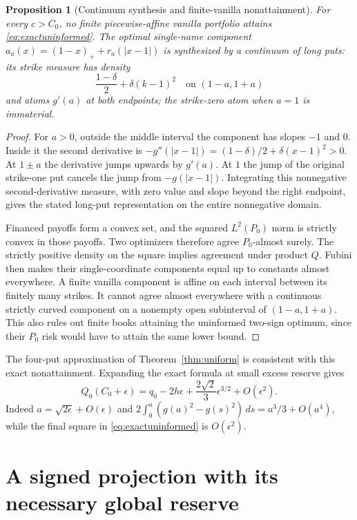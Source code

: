 \documentclass[11pt,a4paper]{amsart}
\theoremstyle{plain}
\newtheorem{proposition}[theorem]{Proposition}
\theoremstyle{definition}
\theoremstyle{remark}
\begin{document}
\begin{proposition}[Continuum synthesis and finite-vanilla nonattainment]\label{prop:nonattainment}
For every $c>C_0$, no finite piecewise-affine vanilla portfolio attains \eqref{eq:exactuninformed}. The optimal single-name component
$a_a(x)=(1-x)_++r_a(|x-1|)$ is synthesized by a continuum of long puts: its strike measure has density
\[
 \frac{1-\delta}{2}+\delta(k-1)^2\quad\text{on }(1-a,1+a)
\]
and atoms $g'(a)$ at both endpoints; the strike-zero atom when $a=1$ is immaterial.
\end{proposition}
\begin{proof}
For $a>0$, outside the middle interval the component has slopes $-1$ and $0$. Inside it the second derivative is
$-g''(|x-1|)=(1-\delta)/2+\delta(x-1)^2>0$.
At $1\pm a$ the derivative jumps upwards by $g'(a)$. At $1$ the jump of the original strike-one put cancels the jump from $-g(|x-1|)$. Integrating this nonnegative second-derivative measure, with zero value and slope beyond the right endpoint, gives the stated long-put representation on the entire nonnegative domain.

Financed payoffs form a convex set, and the squared $L^2(P_0)$ norm is strictly convex in those payoffs. Two optimizers therefore agree $P_0$-almost surely. The strictly positive density on the square implies agreement under product $Q$. Fubini then makes their single-coordinate components equal up to constants almost everywhere. A finite vanilla component is affine on each interval between its finitely many strikes. It cannot agree almost everywhere with a continuous strictly curved component on a nonempty open subinterval of $(1-a,1+a)$. This also rules out finite books attaining the uninformed two-sign optimum, since their $P_0$ risk would have to attain the same lower bound.
\end{proof}
The four-put approximation of Theorem~\ref{thm:uniform} is consistent with this exact nonattainment. Expanding the exact formula at small excess reserve gives
\begin{equation}\label{eq:localrefinement}
 Q_0(C_0+\epsilon)=q_0-2h\epsilon
 +\frac{2\sqrt2}{3}\epsilon^{3/2}+O(\epsilon^2).
\end{equation}
Indeed $a=\sqrt{2\epsilon}+O(\epsilon)$ and
$2\int_0^a(g(a)^2-g(s)^2)\,ds=a^3/3+O(a^4)$, while the final square in \eqref{eq:exactuninformed} is $O(\epsilon^2)$.

\section{A signed projection with its necessary global reserve}\label{sec:projection}
\end{document}
